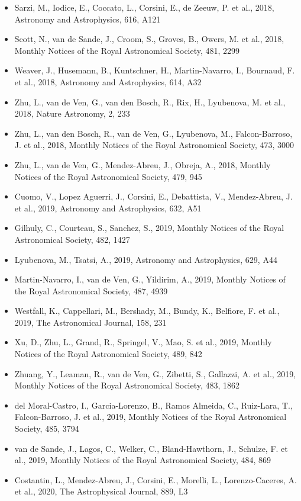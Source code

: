 \documentclass{letter}
\begin{document}
\begin{enumerate}
\begin{itemize}
\item Sarzi, M., Iodice, E., Coccato, L., Corsini, E., de Zeeuw, P. et al., 2018, Astronomy and Astrophysics, 616, A121
\item Scott, N., van de Sande, J., Croom, S., Groves, B., Owers, M. et al., 2018, Monthly Notices of the Royal Astronomical Society, 481, 2299
\item Weaver, J., Husemann, B., Kuntschner, H., Martin-Navarro, I., Bournaud, F. et al., 2018, Astronomy and Astrophysics, 614, A32
\item Zhu, L., van de Ven, G., van den Bosch, R., Rix, H., Lyubenova, M. et al., 2018, Nature Astronomy, 2, 233
\item Zhu, L., van den Bosch, R., van de Ven, G., Lyubenova, M., Falcon-Barroso, J. et al., 2018, Monthly Notices of the Royal Astronomical Society, 473, 3000
\item Zhu, L., van de Ven, G., Mendez-Abreu, J., Obreja, A., 2018, Monthly Notices of the Royal Astronomical Society, 479, 945
\item Cuomo, V., Lopez Aguerri, J., Corsini, E., Debattista, V., Mendez-Abreu, J. et al., 2019, Astronomy and Astrophysics, 632, A51
\item Gilhuly, C., Courteau, S., Sanchez, S., 2019, Monthly Notices of the Royal Astronomical Society, 482, 1427
\item Lyubenova, M., Tsatsi, A., 2019, Astronomy and Astrophysics, 629, A44
\item Martin-Navarro, I., van de Ven, G., Yildirim, A., 2019, Monthly Notices of the Royal Astronomical Society, 487, 4939
\item Westfall, K., Cappellari, M., Bershady, M., Bundy, K., Belfiore, F. et al., 2019, The Astronomical Journal, 158, 231
\item Xu, D., Zhu, L., Grand, R., Springel, V., Mao, S. et al., 2019, Monthly Notices of the Royal Astronomical Society, 489, 842
\item Zhuang, Y., Leaman, R., van de Ven, G., Zibetti, S., Gallazzi, A. et al., 2019, Monthly Notices of the Royal Astronomical Society, 483, 1862
\item del Moral-Castro, I., Garcia-Lorenzo, B., Ramos Almeida, C., Ruiz-Lara, T., Falcon-Barroso, J. et al., 2019, Monthly Notices of the Royal Astronomical Society, 485, 3794
\item van de Sande, J., Lagos, C., Welker, C., Bland-Hawthorn, J., Schulze, F. et al., 2019, Monthly Notices of the Royal Astronomical Society, 484, 869
\item Costantin, L., Mendez-Abreu, J., Corsini, E., Morelli, L., Lorenzo-Caceres, A. et al., 2020, The Astrophysical Journal, 889, L3

\end{itemize}
\end{enumerate}
\end{document}
